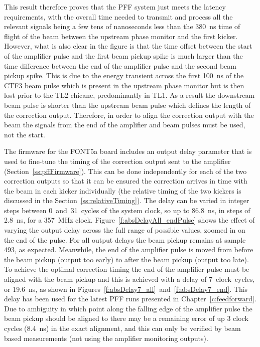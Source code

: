 This result therefore proves that the PFF system just meets the latency requirements, with the overall time needed to transmit and process all the relevant signals being a few tens of nanoseconds less than the 380~ns time of flight of the beam between the upstream phase monitor and the first kicker. However, what is also clear in the figure is that the time offset between the start of the amplifier pulse and the first beam pickup spike is much larger than the time difference between the end of the amplifier pulse and the second beam pickup spike. This is due to the energy transient across the first 100~ns of the CTF3 beam pulse which is present in the upstream phase monitor but is then lost prior to the TL2 chicane, predominantly in TL1. As a result the downstream beam pulse is shorter than the upstream beam pulse which defines the length of the correction output. Therefore, in order to align the correction output with the beam the signals from the end of the amplifier and beam pulses must be used, not the start.

The firmware for the FONT5a board includes an output delay parameter that is used to fine-tune the timing of the correction output sent to the amplifier (Section~\ref{ss:pffFirmware}). This can be done independently for each of the two correction outputs so that it can be ensured the correction arrives in time with the beam in each kicker individually (the relative timing of the two kickers is discussed in the Section~\ref{ss:relativeTiming}). 
The delay can be varied in integer steps between 0~and~31~cycles of the system clock, so up to 86.8~ns, in steps of 2.8~ns, for a 357~MHz clock. 
Figure~\ref{f:absDelayAll_endPulse} shows the effect of varying the output delay across the full range of possible values, zoomed in on the end of the pulse. For all output delays the beam pickup remains at sample 493, as expected. Meanwhile, the end of the amplifier pulse is moved from before the beam pickup (output too early) to after the beam pickup (output too late). To achieve the optimal correction timing the end of the amplifier pulse must be aligned with the beam pickup and this is achieved with a delay of 7~clock~cycles, or 19.6~ns, as shown in Figures~\ref{f:absDelay7_all}~and~\ref{f:absDelay7_end}. This delay has been used for the latest PFF runs presented in Chapter~\ref{c:feedforward}. Due to ambiguity in which point along the falling edge of the amplifier pulse the beam pickup should be aligned to there may be a remaining error of up 3 clock cycles (8.4~ns) in the exact alignment, and this can only be verified by beam based measurements (not using the amplifier monitoring outputs). 

